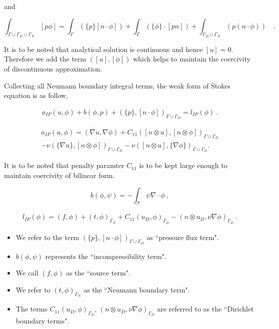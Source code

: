 \documentclass[a4paper,oneside,openright,spanish,english]{book}
\begin{document}
and 

\begin{equation}
\int_{\Gamma \cup \Gamma_D \cup \Gamma_N} [p \phi] = \int_{\Gamma} (\lbrace p \rbrace [ n \cdot \phi]) + \int_{\Gamma} (\lbrace \phi \rbrace \cdot [pn]) + \int_{\Gamma_D \cup \Gamma_N} (p (n \cdot \phi) ) \quad \textrm{.}
\end{equation}

It is to be noted that analytical solution is continuous and hence $[u] = 0$. Therefore we add the term $([u],[\phi])$ which helps to maintain the coercivity of discontinuous approximation.


Collecting all Neumann boundary integral terms, the weak form of Stokes equation is as follow,

\begin{equation}\label{stokes_weak_ch3}
\begin{split}
a_{IP}(u,\phi) + b(\phi,p) + (\lbrace p \rbrace,[n\cdot \phi])_{\Gamma \cup \Gamma_D} = l_{IP}(\phi) \ .
\end{split}
\end{equation}

\begin{equation}\label{a_IP}
\begin{split}
a_{IP}(u,\phi) = (\nabla u, \nabla \phi) + C_{11} ([n \otimes u],[n \otimes \phi])_{\Gamma \cup \Gamma_D} \\
- \nu (\{\nabla u\},[n \otimes \phi])_{\Gamma \cup \Gamma_D} - \nu ([n \otimes u],\{\nabla \phi\})_{\Gamma \cup \Gamma_D} \textrm{.}
\end{split}
\end{equation}

It is to be noted that penalty paramter $C_{11}$ is to be kept large enough to maintain coercivity of bilinear form.

\begin{equation}\label{b}
b(\phi,\psi) = -\int_{\mathcal{T}} \psi \nabla \cdot \phi \ ,
\end{equation}

\begin{equation}\label{l_IP}
\begin{split}
l_{IP}(\phi) = (f,\phi) + (t,\phi)_{\Gamma_N} + C_{11} (u_D,\phi)_{\Gamma_D} - (n \otimes u_D, \nu \nabla \phi)_{\Gamma_D} \ .
\end{split}
\end{equation}

\begin{itemize}
\item We refer to the term $(\lbrace p \rbrace,[n\cdot \phi])_{\Gamma \cup \Gamma_D}$ as ``pressure flux term".
\item $b(\phi,\psi)$ represents the ``incompressibility term".
\item We call $(f,\phi)$ as the ``source term".
\item We refer to $(t,\phi)_{\Gamma_N}$ as the ``Neumann boundary term".
\item The terms $C_{11} (u_D,\phi)_{\Gamma_D}$, $(n \otimes u_D, \nu \nabla \phi)_{\Gamma_D}$ are referred to as the ``Dirichlet boundary terms".
\end{itemize}
\end{document}
